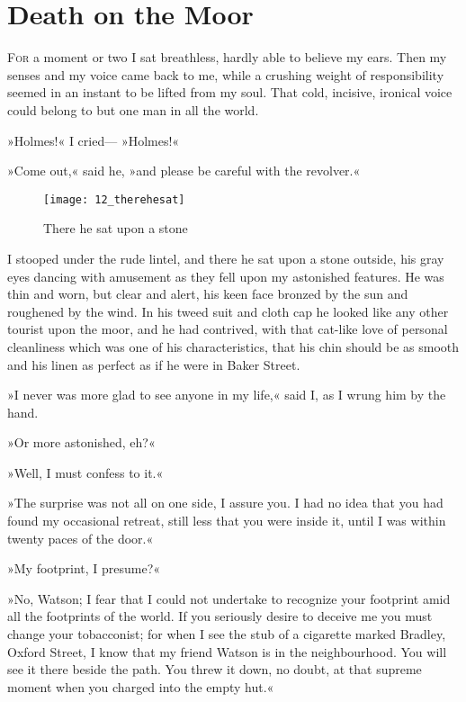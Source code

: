 \chapter{Death on the Moor}
\lettrine[lines=4]{F}{or} a moment or two I sat breathless, hardly able to believe my ears. Then my senses and my voice came back to me, while a crushing weight of responsibility seemed in an instant to be lifted from my soul. That cold, incisive, ironical voice could belong to but one man in all the world.

»Holmes!« I cried— »Holmes!«

»Come out,« said he, »and please be careful with the revolver.«

\begin{figure}[tbph]
\centering
\texttt{[image: 12\_therehesat]}
\caption{There he sat upon a stone}
\end{figure}

I stooped under the rude lintel, and there he sat upon a stone outside, his gray eyes dancing with amusement as they fell upon my astonished features. He was thin and worn, but clear and alert, his keen face bronzed by the sun and roughened by the wind. In his tweed suit and cloth cap he looked like any other tourist upon the moor, and he had contrived, with that cat-like love of personal cleanliness which was one of his characteristics, that his chin should be as smooth and his linen as perfect as if he were in Baker Street.

»I never was more glad to see anyone in my life,« said I, as I wrung him by the hand.

»Or more astonished, eh?«

»Well, I must confess to it.«

»The surprise was not all on one side, I assure you. I had no idea that you had found my occasional retreat, still less that you were inside it, until I was within twenty paces of the door.«

»My footprint, I presume?«

»No, Watson; I fear that I could not undertake to recognize your footprint amid all the footprints of the world. If you seriously desire to deceive me you must change your tobacconist; for when I see the stub of a cigarette marked Bradley, Oxford Street, I know that my friend Watson is in the neighbourhood. You will see it there beside the path. You threw it down, no doubt, at that supreme moment when you charged into the empty hut.«


